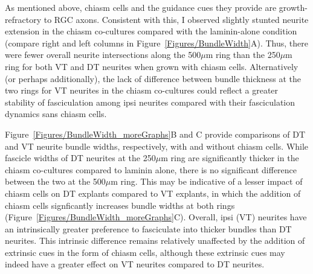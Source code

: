 As mentioned above, chiasm cells and the guidance cues they provide are growth-refractory to RGC axons.
Consistent with this, I observed slightly stunted neurite extension in the chiasm co-cultures compared with the laminin-alone condition (compare right and left columns in Figure~\ref{Figures/BundleWidth}A).
Thus, there were fewer overall neurite intersections along the 500$\mu$m ring than the 250$\mu$m ring for both VT and DT neurites when grown with chiasm cells.
Alternatively (or perhaps additionally), the lack of difference between bundle thickness at the two rings for VT neurites in the chiasm co-cultures could reflect a greater stability of fasciculation among ipsi neurites compared with their fasciculation dynamics sans chiasm cells.

Figure~\ref{Figures/BundleWidth_moreGraphs}B and C provide comparisons of DT and VT neurite bundle widths, respectively, with and without chiasm cells.
While fascicle widths of DT neurites at the 250$\mu$m ring are significantly thicker in the chiasm co-cultures compared to laminin alone, there is no significant difference between the two at the 500$\mu$m ring.
This may be indicative of a lesser impact of chiasm cells on DT explants compared to VT explants, in which the addition of chiasm cells signficantly increases bundle widths at both rings (Figure~\ref{Figures/BundleWidth_moreGraphs}C).
Overall, ipsi (VT) neurites have an intrinsically greater preference to fasciculate into thicker bundles than DT neurites.
This intrinsic difference remains relatively unaffected by the addition of extrinsic cues in the form of chiasm cells, although these extrinsic cues may indeed have a greater effect on VT neurites compared to DT neurites.